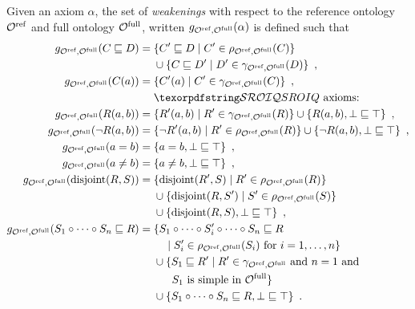 \begin{definition} \label{def:weaken}
  Given an axiom $\alpha$, the set of \emph{weakenings} with respect to the reference ontology ${\mathcal{O}^\textnormal{ref}}$ and full ontology ${\mathcal{O}^\textnormal{full}}$, written $g_{{\mathcal{O}^\textnormal{ref}},{\mathcal{O}^\textnormal{full}}}(\alpha)$ is defined such that
  \begin{align*}
    g_{\Omcref,\Omcfull}(C \sqsubseteq D) ={} & \{ C' \sqsubseteq D \mid C' \in \rho_{\Omcref,\Omcfull} (C) \} \\
    & \cup \{ C \sqsubseteq D' \mid D' \in \gamma_{\Omcref,\Omcfull}(D) \} \enspace, \\
    g_{\Omcref,\Omcfull}(C(a)) ={} & \{ C'(a) \mid C' \in \gamma_{\Omcref,\Omcfull}(C) \} \enspace, \\
    & \text{\SROIQ axioms:} \\
    g_{\Omcref,\Omcfull}(R(a, b)) ={} & \{ R'(a, b) \mid R' \in \gamma_{\Omcref,\Omcfull}(R) \} \cup \{ R(a, b), \bot \sqsubseteq \top \} \enspace, \\
    g_{\Omcref,\Omcfull}(\lnot R(a, b)) ={} & \{ \lnot R'(a, b) \mid R' \in \rho_{\Omcref,\Omcfull}(R) \} \cup \{ \lnot R(a, b), \bot \sqsubseteq \top \} \enspace, \\
    g_{\Omcref,\Omcfull}(a = b) ={} & \{ a = b, \bot \sqsubseteq \top \} \enspace, \\
    g_{\Omcref,\Omcfull}(a \not= b) ={} & \{ a \not= b, \bot \sqsubseteq \top \} \enspace, \\
    g_{\Omcref,\Omcfull}(\disjoint(R, S)) ={} & \{ \disjoint(R', S) \mid R' \in \rho_{\Omcref,\Omcfull} (R) \} \\
    & \cup \{ \disjoint(R, S') \mid S' \in \rho_{\Omcref,\Omcfull}(S) \} \\
    & \cup \{ \disjoint (R, S), \bot \sqsubseteq \top \} \enspace, \\
    g_{\Omcref,\Omcfull}(S_1 \circ \cdots \circ S_n \sqsubseteq R) ={} & \{ S_1 \circ \cdots \circ S_i' \circ \cdots \circ S_n \sqsubseteq R \\
    & \quad \mid S_i' \in \rho_{\Omcref,\Omcfull}(S_i) \text{ for } i = 1, \dots, n \} \\
    & \cup \{ S_1 \sqsubseteq R' \mid R' \in \gamma_{\Omcref,\Omcfull} \text{ and } n = 1 \text{ and } \\
    & \quad \enspace \, S_1 \text{ is simple in } \Omcfull \} \\
    & \cup \{ S_1 \circ \cdots \circ S_n \sqsubseteq R, \bot \sqsubseteq \top \} \enspace.
  \end{align*}
\end{definition}


